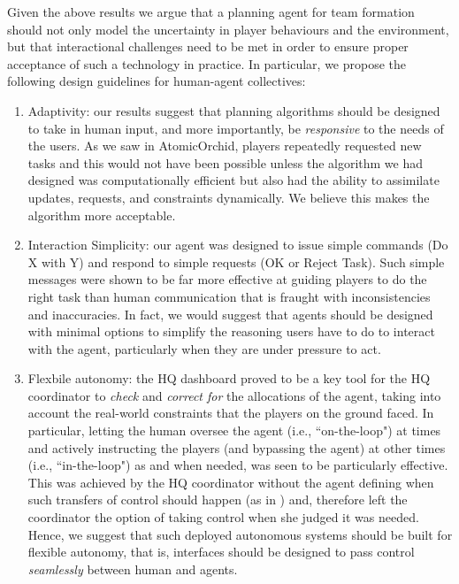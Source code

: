 Given the above results we argue that a planning agent for team formation should not only model the uncertainty in player behaviours and the environment, but that interactional challenges need to be met in order to ensure proper acceptance of such a technology in practice. In particular, we propose the following design guidelines for human-agent collectives:
\begin{enumerate}
\item Adaptivity: our results suggest that planning algorithms should be designed to take in human input, and more importantly, be \emph{responsive} to the needs of the users. As we saw in AtomicOrchid, players repeatedly requested new tasks and this would not have been possible unless the algorithm we had designed was computationally efficient but also had the ability to assimilate updates, requests, and constraints dynamically. We believe this makes the algorithm more acceptable.

\item Interaction Simplicity: our agent was designed to issue simple commands (Do X with Y) and respond to simple requests (OK or Reject Task). Such simple messages were shown to be far more effective at guiding players to do the right task than human communication that is fraught with inconsistencies and inaccuracies. In fact, we would suggest that agents should be designed with minimal options to simplify the reasoning users have to do to interact with the agent, particularly when they are under pressure to act.

\item Flexbile autonomy: the HQ dashboard proved to be a key tool for the HQ coordinator to \emph{check} and \emph{correct for} the allocations of the agent, taking into account the real-world constraints that the players on the ground faced. In particular, letting the human oversee the agent (i.e., ``on-the-loop") at times and actively instructing  the players (and bypassing the agent) at other times (i.e., ``in-the-loop") as and when needed, was seen to be particularly effective. This was achieved by the HQ coordinator without the agent defining when such transfers of control should happen (as in \cite{scerri:etal:2005}) and, therefore left the coordinator the option of taking control when she judged it was needed. Hence, we suggest that such deployed autonomous systems should be built for flexible autonomy, that is, interfaces should be designed to pass control \emph{seamlessly} between human and agents.
\end{enumerate}

